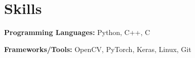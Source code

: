 \documentclass[letterpaper,11pt]{article}
\makeatletter
\newcommand{\JobSubheading}[4]{
  \vspace{-1pt}
    \begin{tabular*}{\textwidth}[t]{l@{\extracolsep{\fill}}r}
      \textbf {#1} & \textit{#2}  \\
      \textit{#3} & \textit{#4} \\
    \end{tabular*}\vspace{-5pt}
}
\makeatother
\begin{document}
        
    \begin{comment}
    
    \JobSubheading
      {Pharos Lab, The University of Texas at Austin}{Austin, TX}
      {Lab Assistant}{Jan 2014 - May 2014}
      \vspace{0pt}
      \begin{itemize}
        \item Helped setup robots in Linux and ROS
      \end{itemize}
    
    \JobSubheading
      {Sanger Learning Center, The University of Texas at Austin}{Austin, TX}
      {Undergraduate Tutor}{Sep 2013 - Sep 2014}
      \vspace{0pt}
      \begin{itemize}
        \item Tutored peers in Calculus and French
      \end{itemize}
    
    \JobSubheading
      {ECE Department, The University of Texas at Austin}{Austin, TX}
      {Graduate Teaching Assistant}{Aug 2015 - Dec 2016}
      \vspace{0pt}
      \begin{itemize}
        \item Certified TA for undergraduate Signals and Systems course
      
    \end{comment}
      

\section{\color{BlueViolet} Skills}

      \small \textbf{Programming Languages:} Python, C++, C
      \vspace{1pt}
      
      \textbf{Frameworks/Tools:} OpenCV, PyTorch, Keras, Linux, Git
      \vspace{1pt}

      \vspace{1pt}
      
\end{document}
